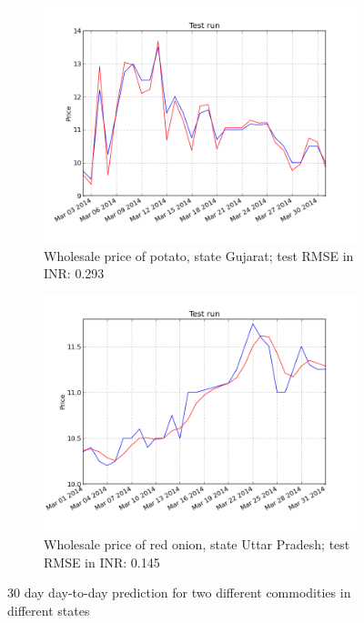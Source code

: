 \begin{figure}[!ht]
    \centering
        \begin{subfigure}[b]{.45\textwidth}
        \centering
        \includegraphics[width=\textwidth]{./img/plots/esn/daily/gujarat_potato_online_30d_1d.png}
        \caption{Wholesale price of potato, state Gujarat; test RMSE in INR: 0.293}
        \label{subfig:res_30d_1}
        \end{subfigure}
        \quad
        \begin{subfigure}[b]{.45\textwidth}
        \centering
        \includegraphics[width=\textwidth]{./img/plots/esn/daily/uttar_pradesh_redonion_30d_1d.png}
        \caption{Wholesale price of red onion, state Uttar Pradesh; test RMSE in INR: 0.145}
        \label{subfig:res_30d_2}
        \end{subfigure}
    \caption{30 day day-to-day prediction for two different commodities in different states}
    \label{fig:res_30d}
\end{figure}

